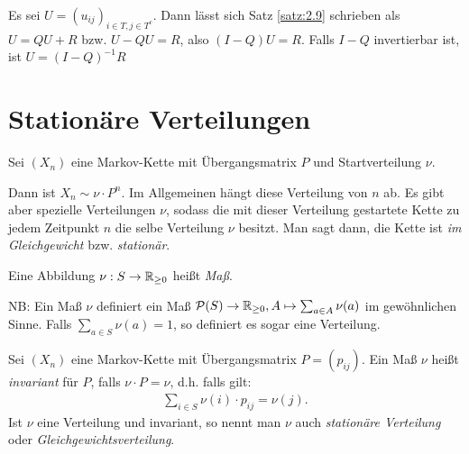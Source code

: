 \documentclass[a4paper,twoside,DIV15,BCOR12mm]{scrbook}
\begin{document}
\begin{bemerkung}
Es sei $U=(u_{ij})_{i\in T, j\in T^c}$. Dann lässt sich Satz \ref{satz:2.9} schrieben als $U=QU+R$ bzw. $U-QU=R$, also $(I-Q)U=R$. Falls $I-Q$ invertierbar ist, ist $U=(I-Q)^{-1}R$
\end{bemerkung}

\section{Stationäre Verteilungen}

Sei $(X_n)$ eine Markov-Kette mit Übergangsmatrix $P$ und Startverteilung $\nu$.

Dann ist $X_n \sim \nu \cdot P^n$. Im Allgemeinen hängt diese Verteilung von $n$ ab. Es gibt aber spezielle Verteilungen
$\nu$, sodass die mit dieser Verteilung gestartete Kette zu jedem Zeitpunkt $n$ die selbe Verteilung $\nu$ besitzt. Man sagt dann,
die Kette ist \emph{im Gleichgewicht} bzw. \emph{stationär}.

\begin{definition}
  Eine Abbildung $\nu: S \rightarrow \mathbb{R}_{\geq 0}$ heißt \emph{Maß}.

  NB: Ein Maß $\nu$ definiert ein Maß $\mathcal{P}(S) \rightarrow \mathbb{R}_{\geq 0}, A \mapsto \sum_{a \in A} \nu(a) $ im gewöhnlichen Sinne.
  Falls $\sum_{a \in S} \nu(a) = 1$, so definiert es sogar eine Verteilung.
\end{definition}

\begin{definition}
  Sei $(X_n)$ eine Markov-Kette mit Übergangsmatrix $P = (p_{ij})$. Ein Maß $\nu$ heißt \emph{invariant} für $P$, falls $\nu \cdot P = \nu$, d.h.
  falls gilt:
  \begin{align*}
    \sum_{i \in S} \nu(i) \cdot p_{ij} = \nu(j).
  \end{align*}
  Ist $\nu$ eine Verteilung und invariant, so nennt man $\nu$ auch \emph{stationäre Verteilung} oder \emph{Gleichgewichtsverteilung}.
\end{definition}
\end{document}
